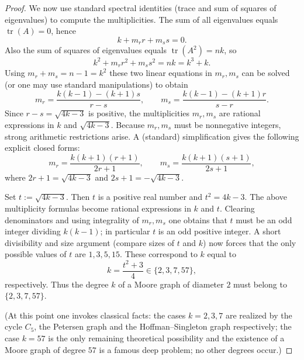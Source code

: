 \documentclass[12pt,a4paper,openany]{book}
\begin{document}
\begin{proof}
We now use standard spectral identities (trace and sum of squares of
eigenvalues) to compute the multiplicities. The sum of all eigenvalues
equals \(\operatorname{tr}(A)=0\), hence
\[
k + m_r r + m_s s = 0.
\]
Also the sum of squares of eigenvalues equals \(\operatorname{tr}(A^2)=nk\),
so
\[
k^2 + m_r r^2 + m_s s^2 = nk = k^3 + k.
\]
Using \(m_r+m_s = n-1 = k^2\) these two linear equations in \(m_r,m_s\)
can be solved (or one may use standard manipulations) to obtain
\[
m_r = \frac{k(k-1) - (k+1)s}{r-s},\qquad
m_s = \frac{k(k-1) - (k+1)r}{s-r}.
\]
Since \(r-s = \sqrt{4k-3}\) is positive, the multiplicities \(m_r,m_s\)
are rational expressions in \(k\) and \(\sqrt{4k-3}\). Because
\(m_r,m_s\) must be nonnegative integers, strong arithmetic restrictions
arise. A (standard) simplification gives the following explicit closed
forms:
\[
m_r = \frac{k(k+1)(r+1)}{2r+1},\qquad
m_s = \frac{k(k+1)(s+1)}{2s+1},
\]
where \(2r+1=\sqrt{4k-3}\) and \(2s+1=-\sqrt{4k-3}\).

Set \(t := \sqrt{4k-3}\). Then \(t\) is a positive real number and
\(t^2 = 4k-3\). The above multiplicity formulas become rational
expressions in \(k\) and \(t\). Clearing denominators and using
integrality of \(m_r,m_s\) one obtains that \(t\) must be an odd integer
dividing \(k(k-1)\); in particular \(t\) is an odd positive integer. A
short divisibility and size argument (compare sizes of \(t\) and \(k\))
now forces that the only possible values of \(t\) are \(1,3,5,15\).
These correspond to \(k\) equal to
\[
k = \frac{t^2+3}{4} \in \{2,3,7,57\},
\]
respectively. Thus the degree \(k\) of a Moore graph of diameter \(2\)
must belong to \(\{2,3,7,57\}\).

(At this point one invokes classical facts: the cases \(k=2,3,7\) are
realized by the cycle \(C_5\), the Petersen graph and the
Hoffman--Singleton graph respectively; the case \(k=57\) is the only
remaining theoretical possibility and the existence of a Moore graph of
degree \(57\) is a famous deep problem; no other degrees occur.)
\end{proof}
\end{document}
